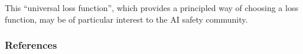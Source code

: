 \documentclass[twoside]{article}
\theoremstyle{plain}
\theoremstyle{definition}
\begin{document}

This ``universal loss function'',
which provides a principled way of choosing a loss function,
may be of particular interest to the AI safety community.




\subsubsection*{References}

\end{document}
